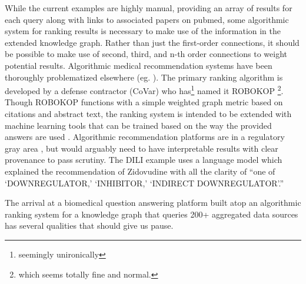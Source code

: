 While the current examples are highly manual, providing an array of
results for each query along with links to associated papers on pubmed,
some algorithmic system for ranking results is necessary to make use of
the information in the extended knowledge graph. Rather than just the
first-order connections, it should be possible to make use of second,
third, and n-th order connections to weight potential results.
Algorithmic medical recommendation systems have been thoroughly
problematized elsewhere (eg. \citep{groteEthicsAlgorithmicDecisionmaking2020, obermeyerDissectingRacialBias2019, panchArtificialIntelligenceAlgorithmic2019, panchInconvenientTruthAI2019} ). The primary ranking algorithm is developed by a defense
contractor (CoVar) who has\footnote{seemingly unironically} named it
ROBOKOP \citep{mortonROBOKOPAbstractionLayer2019} \footnote{which
  seems totally fine and normal.}. Though ROBOKOP functions with a
simple weighted graph metric based on citations and abstract text, the
ranking system is intended to be extended with machine learning tools
\citep{mortonROBOKOPAbstractionLayer2019}  that can be trained
based on the way the provided answers are used \citep{consortiumUniversalBiomedicalData2019} . Algorithmic recommendation
platforms are in a regulatory gray area \citep{ordishAlgorithmsMedicalDevices2019, el-sayedMedicalAlgorithmsNeed2021} , but would arguably need to have interpretable results with clear
provenance to pass scrutiny. The DILI example uses a language model
which explained the recommendation of Zidovudine with all the clarity of
``one of `DOWNREGULATOR,' `INHIBITOR,' `INDIRECT DOWNREGULATOR'.''

The arrival at a biomedical question answering platform built atop an
algorithmic ranking system for a knowledge graph that queries 200+
aggregated data sources has several qualities that should give us pause.

